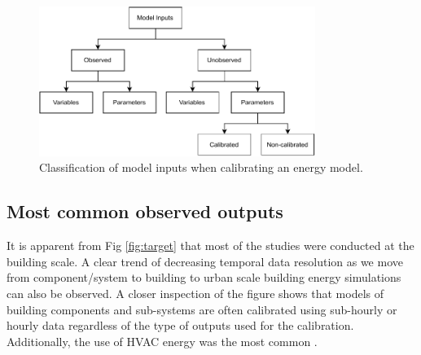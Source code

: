\documentclass[review]{elsarticle}
\begin{document}
\begin{figure}[!h]
\centering 
\includegraphics[width=0.8\textwidth]{figures/inputs.pdf}
\caption{Classification of model inputs when calibrating an energy model.}
\label{fig:input_scheme}
\end{figure}




\subsection{Most common observed outputs}

It is apparent from Fig \ref{fig:target} that most of the studies were conducted at the building scale. A clear trend of decreasing temporal data resolution as we move from component/system to building to urban scale building energy simulations can also be observed. A closer inspection of the figure shows that models of building components and sub-systems are often calibrated using sub-hourly or hourly data regardless of the type of outputs used for the calibration. Additionally, the use of HVAC energy was the most common \cite{chong2017bayesian, cacabelos2017development, kantehsakiliba2020energy, larochellemartin2019energy}.
\end{document}
